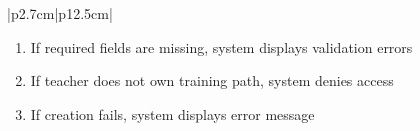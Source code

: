 \begin{table}[H]
\begin{tabular}{|p{2.7cm}|p{12.5cm}|}
\begin{minipage}[t]{\linewidth}
                                      \begin{enumerate}[topsep=0pt,itemsep=1pt,parsep=0pt,partopsep=0pt]
                                          \item If required fields are missing, system displays validation errors
                                          \item If teacher does not own training path, system denies access
                                          \item If creation fails, system displays error message
                                      \end{enumerate}
                                  \end{minipage} \\
        \hline
    \end{tabular}
    \label{tab:teacher-add-module}
\end{table}
